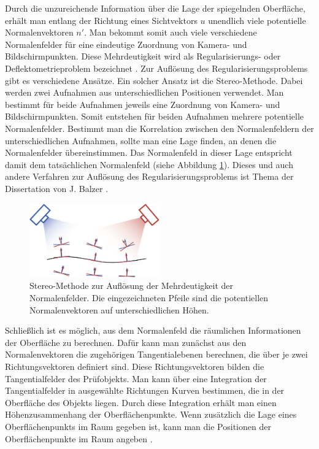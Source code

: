 \p
Durch die unzureichende Information über die Lage der spiegelnden Oberfläche, erhält man entlang der Richtung eines Sichtvektors $u$ unendlich viele potentielle Normalenvektoren $n'$.
Man bekommt somit auch viele verschiedene Normalenfelder für eine eindeutige Zuordnung von Kamera- und Bildschirmpunkten.
Diese Mehrdeutigkeit wird als Regularisierungs- oder Deflektometrieproblem bezeichnet \cite{regularisierungsproblem}.
Zur Auflösung des Regularisierungsproblems gibt es verschiedene Ansätze.
Ein solcher Ansatz ist die Stereo-Methode.
Dabei werden zwei Aufnahmen aus unterschiedlichen Positionen verwendet.
Man bestimmt für beide Aufnahmen jeweils eine Zuordnung von Kamera- und Bildschirmpunkten.
Somit entstehen für beiden Aufnahmen mehrere potentielle Normalenfelder.
Bestimmt man die Korrelation zwischen den Normalenfeldern der unterschiedlichen Aufnahmen, sollte man eine Lage finden, an denen die Normalenfelder übereinstimmen.
Das Normalenfeld in dieser Lage entspricht damit dem tatsächlichen Normalenfeld (siehe Abbildung \ref{img:stereoVerfahren}).
Dieses und auch andere Verfahren zur Auflösung des Regularisierungsproblems ist Thema der Dissertation von J. Balzer \cite{regularisierungsproblem}.
%
\begin{figure}[H]
	\centering
	\includegraphics[width=0.5\textwidth]{02_grundlagenZurDeflektometrie/rekonstruktion/rekonstruktionUndRegularisierungsproblem/figures/stereoVerfahren}
	\caption[Stereo-Methode zur Lösung des Regularisierungsproblems]{Stereo-Methode zur Auflösung der Mehrdeutigkeit der Normalenfelder. Die eingezeichneten Pfeile sind die potentiellen Normalenvektoren auf unterschiedlichen Höhen. \cite{stereoDeflektometrie}}
	\label{img:stereoVerfahren}
\end{figure}
%
\noindent
Schließlich ist es möglich, aus dem Normalenfeld die räumlichen Informationen der Oberfläche zu berechnen.
Dafür kann man zunächst aus den Normalenvektoren die zugehörigen Tangentialebenen berechnen, die über je zwei Richtungsvektoren definiert sind.
Diese Richtungsvektoren bilden die Tangentialfelder des Prüfobjekts.
Man kann über eine Integration der Tangentialfelder in ausgewählte Richtungen Kurven bestimmen, die in der Oberfläche des Objekts liegen.
Durch diese Integration erhält man einen Höhenzusammen\-hang der Oberflächenpunkte.
Wenn zusätzlich die Lage eines Oberflächenpunkts im Raum gegeben ist, kann man die Positionen der Oberflächenpunkte im Raum angeben \cite{kit_werling}.